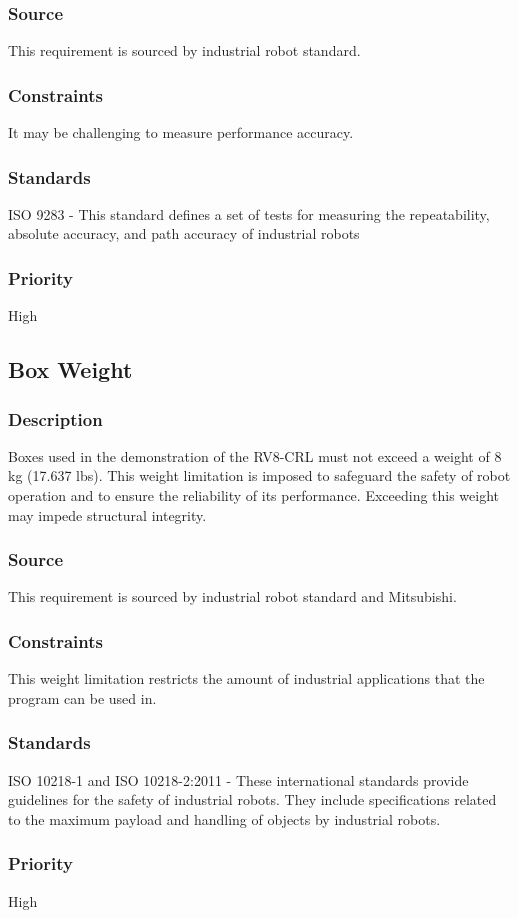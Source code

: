 \subsubsection{Source}
This requirement is sourced by industrial robot standard.
\subsubsection{Constraints}
It may be challenging to measure performance accuracy.
\subsubsection{Standards}
ISO 9283 - This standard defines a set of tests for measuring the repeatability, absolute accuracy, and path accuracy of industrial robots
\subsubsection{Priority}
High


\subsection{Box Weight}
\subsubsection{Description}
Boxes used in the demonstration of the RV8-CRL must not exceed a weight of 8 kg (17.637 lbs). This weight limitation is imposed to safeguard the safety of robot operation and to ensure the reliability of its performance. Exceeding this weight may impede structural integrity.
\subsubsection{Source}
This requirement is sourced by industrial robot standard and Mitsubishi.
\subsubsection{Constraints}
This weight limitation restricts the amount of industrial applications that the program can be used in.
\subsubsection{Standards}
ISO 10218-1 and ISO 10218-2:2011 - These international standards provide guidelines for the safety of industrial robots. They include specifications related to the maximum payload and handling of objects by industrial robots.
\subsubsection{Priority}
High